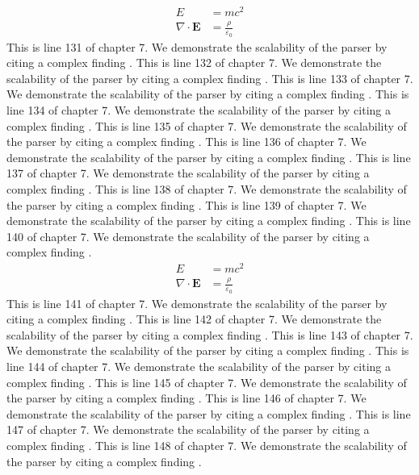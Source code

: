 \begin{align*}
  E &= mc^2 \\
  \nabla \cdot \mathbf{E} &= \frac{\rho}{\varepsilon_0}
\end{align*}
This is line 131 of chapter 7. We demonstrate the scalability of the parser by citing a complex finding \cite{ref7_131}.
This is line 132 of chapter 7. We demonstrate the scalability of the parser by citing a complex finding \cite{ref7_132}.
This is line 133 of chapter 7. We demonstrate the scalability of the parser by citing a complex finding \cite{ref7_133}.
This is line 134 of chapter 7. We demonstrate the scalability of the parser by citing a complex finding \cite{ref7_134}.
This is line 135 of chapter 7. We demonstrate the scalability of the parser by citing a complex finding \cite{ref7_135}.
This is line 136 of chapter 7. We demonstrate the scalability of the parser by citing a complex finding \cite{ref7_136}.
This is line 137 of chapter 7. We demonstrate the scalability of the parser by citing a complex finding \cite{ref7_137}.
This is line 138 of chapter 7. We demonstrate the scalability of the parser by citing a complex finding \cite{ref7_138}.
This is line 139 of chapter 7. We demonstrate the scalability of the parser by citing a complex finding \cite{ref7_139}.
This is line 140 of chapter 7. We demonstrate the scalability of the parser by citing a complex finding \cite{ref7_140}.
\begin{align*}
  E &= mc^2 \\
  \nabla \cdot \mathbf{E} &= \frac{\rho}{\varepsilon_0}
\end{align*}
This is line 141 of chapter 7. We demonstrate the scalability of the parser by citing a complex finding \cite{ref7_141}.
This is line 142 of chapter 7. We demonstrate the scalability of the parser by citing a complex finding \cite{ref7_142}.
This is line 143 of chapter 7. We demonstrate the scalability of the parser by citing a complex finding \cite{ref7_143}.
This is line 144 of chapter 7. We demonstrate the scalability of the parser by citing a complex finding \cite{ref7_144}.
This is line 145 of chapter 7. We demonstrate the scalability of the parser by citing a complex finding \cite{ref7_145}.
This is line 146 of chapter 7. We demonstrate the scalability of the parser by citing a complex finding \cite{ref7_146}.
This is line 147 of chapter 7. We demonstrate the scalability of the parser by citing a complex finding \cite{ref7_147}.
This is line 148 of chapter 7. We demonstrate the scalability of the parser by citing a complex finding \cite{ref7_148}.
